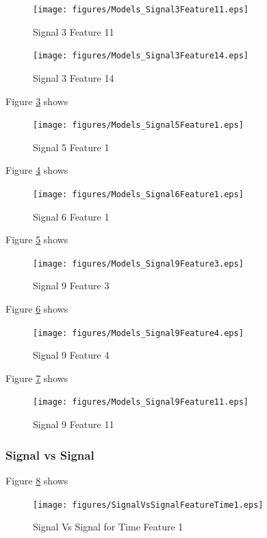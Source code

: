 \documentclass{article}
\begin{document}
\begin{figure}[H]
    \centering
    \texttt{[image: figures/Models\_Signal3Feature11.eps]}
    \caption{Signal 3 Feature 11}
    \label{fig:Models_Signal3Feature11}
\end{figure}
 
\begin{figure}[H]
    \centering
    \texttt{[image: figures/Models\_Signal3Feature14.eps]}
    \caption{Signal 3 Feature 14}
    \label{fig:Models_Signal3Feature14}
\end{figure}


Figure \ref{fig:Models_Signal5Feature1} shows 
\begin{figure}[H]
    \centering
    \texttt{[image: figures/Models\_Signal5Feature1.eps]}
    \caption{Signal 5 Feature 1}
    \label{fig:Models_Signal5Feature1}
\end{figure}



Figure \ref{fig:Models_Signal6Feature1} shows 
\begin{figure}[H]
    \centering
    \texttt{[image: figures/Models\_Signal6Feature1.eps]}
    \caption{Signal 6 Feature 1}
    \label{fig:Models_Signal6Feature1}
\end{figure}


Figure \ref{fig:Models_Signal9Feature3} shows 
\begin{figure}[H]
    \centering
    \texttt{[image: figures/Models\_Signal9Feature3.eps]}
    \caption{Signal 9 Feature 3}
    \label{fig:Models_Signal9Feature3}
\end{figure}
Figure \ref{fig:Models_Signal9Feature4} shows 
\begin{figure}[H]
    \centering
    \texttt{[image: figures/Models\_Signal9Feature4.eps]}
    \caption{Signal 9 Feature 4}
    \label{fig:Models_Signal9Feature4}
\end{figure}
Figure \ref{fig:Models_Signal9Feature11} shows 
\begin{figure}[H]
    \centering
    \texttt{[image: figures/Models\_Signal9Feature11.eps]}
    \caption{Signal 9 Feature 11}
    \label{fig:Models_Signal9Feature11}
\end{figure}

\subsubsection{Signal vs Signal}
Figure \ref{fig:SignalVsSignalFeatureTime1} shows 
\begin{figure}[H]
    \centering
    \texttt{[image: figures/SignalVsSignalFeatureTime1.eps]}
    \caption{Signal Vs Signal for Time Feature 1}
    \label{fig:SignalVsSignalFeatureTime1}
\end{figure}
\end{document}
